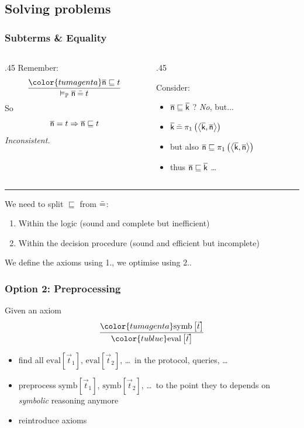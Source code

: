 \documentclass[aspectratio=169]{beamer}
\begin{document}
\subsection{Solving problems}
\begin{frame}
  \frametitle{Subterms \& Equality}

  \begin{columns}
    \begin{column}{.45\textwidth}
      Remember:
      \[
        \frac{\color{tumagenta}\n\sqsubseteq t}{\validp \n \beq t}
      \]\pause
      So
      \[
        \overline{\mathsf{n}} = t \Rightarrow \overline{\mathsf{n}}\sqsubseteq t
      \]\pause
      \emph{Inconsistent.}
    \end{column}

    \begin{column}{.45\textwidth}\pause

      Consider:
      \begin{itemize}
        \item $\overline{\mathsf{n}} \sqsubseteq \overline{\mathsf{k}}$ ? \pause \emph{No}\pause, but...
        \item $\overline{\mathsf{k}} \mathbin{\bar{=}} \pi_1\left( \left< \overline{\mathsf{k}}, \overline{\mathsf{n}}\right> \right)$\pause
        \item but also $\overline{\mathsf{n}} \sqsubseteq \pi_1\left( \left< \overline{\mathsf{k}}, \overline{\mathsf{n}}\right> \right)$
        \item thus $\overline{\mathsf{n}} \sqsubseteq \overline{\mathsf{k}}$ \dots
      \end{itemize}
    \end{column}
  \end{columns}\pause\hrule
    We need to split $\sqsubseteq$ from $\mathbin{\bar{=}}$:
    \begin{enumerate}
      \item Within the logic \pause (sound and complete but inefficient) \pause
      \item Within the decision procedure \pause (sound and efficient but incomplete)
    \end{enumerate}\pause
    We define the axioms using {\color{tublue}1.}, we optimise using {\color{tumagenta} 2.}.
\end{frame}

\begin{frame}
  \frametitle{Option 2: Preprocessing}

  Given an axiom
  \[
      \frac{\color{tumagenta} \mathrm{symb}\left[ \vec t \right]}{\color{tublue} \mathrm{eval}\left[ \vec t \right]}
  \] \pause

  \begin{itemize}
    \item find all $\mathrm{eval}\left[ \vec t_1 \right]$, $\mathrm{eval}\left[ \vec t_2 \right]$, \dots\ in the protocol, queries, \dots \pause
    \item preprocess $\mathrm{symb}\left[ \vec t_1 \right]$, $\mathrm{symb}\left[ \vec t_2 \right]$, \dots\ to the point they to depends on \textit{symbolic} reasoning anymore\pause
    \item reintroduce axioms
  \end{itemize}

\end{frame}
\end{document}
